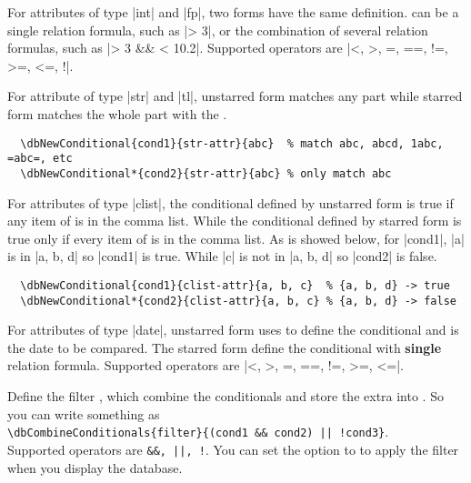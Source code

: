\documentclass[full]{l3doc}
\begin{document}
\begin{documentation}
For attributes of type |int| and |fp|, two forms have the same definition.
 can be a single relation formula, such as |\dbval > 3|, or the
combination of several relation formulas, such as |\dbval > 3 && \dbval < 10.2|.
Supported operators are |<, >, =, ==, !=, >=, <=, !|.

For attribute of type |str| and |tl|, unstarred form matches any part while
starred form matches the whole part with the .
\begin{verbatim}
  \dbNewConditional{cond1}{str-attr}{abc}  % match abc, abcd, 1abc, =abc=, etc
  \dbNewConditional*{cond2}{str-attr}{abc} % only match abc
\end{verbatim}

For attributes of type |clist|, the conditional defined by unstarred form is
true if any item of  is in the comma list. While the
conditional defined by starred form is true only if every item of  is in the comma list. As is showed below, for |cond1|, |a| is in
|{a, b, d}| so |cond1| is true. While |c| is not in |{a, b, d}| so |cond2| is
false.

\begin{verbatim}
  \dbNewConditional{cond1}{clist-attr}{a, b, c}  % {a, b, d} -> true
  \dbNewConditional*{cond2}{clist-attr}{a, b, c} % {a, b, d} -> false
\end{verbatim}

For attributes of type |date|, unstarred form uses  to
define the conditional and  is the date to be compared. The starred
form define the conditional with \textbf{single} relation formula. Supported
operators are |<, >, =, ==, !=, >=, <=|.

\begin{function}{\dbCombineConditionals}
  \begin{syntax}
       
  \end{syntax}

  Define the filter , which combine the conditionals and store the
  extra  into . So you can write something as\\
  \verb=\dbCombineConditionals{filter}{(cond1 && cond2) || !cond3}=.\\
  Supported operators are \verb=&&, ||, !=. You can set the option 
  to  to apply the filter when you display the database.
\end{function}


\end{documentation}
\end{document}

